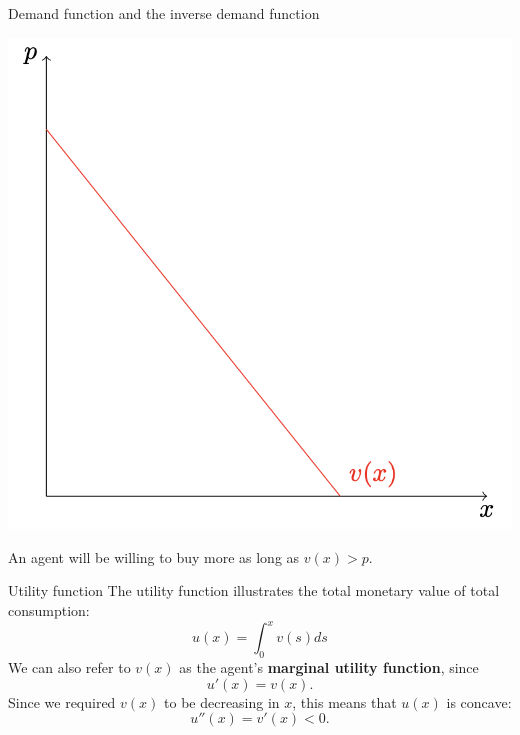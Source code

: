 \begin{theo}{Demand function and the inverse demand function}
\begin{itemize}
\begin{center}
                \includegraphics[scale = 0.2]{Images/Demand/InverseDemandFunction.png}
            \end{center}
            An agent will be willing to buy more as long as $v(x) > p$. 
    \end{itemize}
\end{theo}

\newpage

\begin{theo}{Utility function}
    The utility function illustrates the total monetary value of total consumption:
    \begin{equation*}
        u(x) = \int_0^x v(s)ds
    \end{equation*} 
    We can also refer to $v(x)$ as the agent's \textbf{marginal utility function}, since 
    \begin{equation*}
        u'(x) = v(x).
    \end{equation*}
    Since we required $v(x)$ to be decreasing in $x$, this means that $u(x)$ is concave:
    \begin{equation*}
        u''(x) = v'(x) < 0.
    \end{equation*}
    \vspace*{-0.5cm}
\end{theo}

